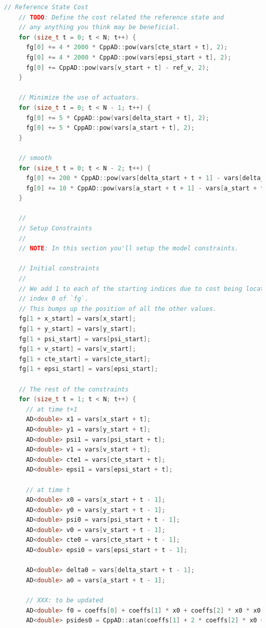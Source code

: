 \documentclass[11pt]{article}
\begin{document}
\begin{lstlisting}[language=C++, caption={MPC solver with ipopt}]
    // Reference State Cost
    // TODO: Define the cost related the reference state and
    // any anything you think may be beneficial.
    for (size_t t = 0; t < N; t++) {
      fg[0] += 4 * 2000 * CppAD::pow(vars[cte_start + t], 2);
      fg[0] += 4 * 2000 * CppAD::pow(vars[epsi_start + t], 2);
      fg[0] += CppAD::pow(vars[v_start + t] - ref_v, 2);
    }

    // Minimize the use of actuators.
    for (size_t t = 0; t < N - 1; t++) {
      fg[0] += 5 * CppAD::pow(vars[delta_start + t], 2);
      fg[0] += 5 * CppAD::pow(vars[a_start + t], 2);
    }

    // smooth
    for (size_t t = 0; t < N - 2; t++) {
      fg[0] += 200 * CppAD::pow(vars[delta_start + t + 1] - vars[delta_start + t], 2);
      fg[0] += 10 * CppAD::pow(vars[a_start + t + 1] - vars[a_start + t], 2);
    }

    //
    // Setup Constraints
    //
    // NOTE: In this section you'll setup the model constraints.

    // Initial constraints
    //
    // We add 1 to each of the starting indices due to cost being located at
    // index 0 of `fg`.
    // This bumps up the position of all the other values.
    fg[1 + x_start] = vars[x_start];
    fg[1 + y_start] = vars[y_start];
    fg[1 + psi_start] = vars[psi_start];
    fg[1 + v_start] = vars[v_start];
    fg[1 + cte_start] = vars[cte_start];
    fg[1 + epsi_start] = vars[epsi_start];

    // The rest of the constraints
    for (size_t t = 1; t < N; t++) {
      // at time t+1
      AD<double> x1 = vars[x_start + t];
      AD<double> y1 = vars[y_start + t];
      AD<double> psi1 = vars[psi_start + t];
      AD<double> v1 = vars[v_start + t];
      AD<double> cte1 = vars[cte_start + t];
      AD<double> epsi1 = vars[epsi_start + t];

      // at time t
      AD<double> x0 = vars[x_start + t - 1];
      AD<double> y0 = vars[y_start + t - 1];
      AD<double> psi0 = vars[psi_start + t - 1];
      AD<double> v0 = vars[v_start + t - 1];
      AD<double> cte0 = vars[cte_start + t - 1];
      AD<double> epsi0 = vars[epsi_start + t - 1];

      AD<double> delta0 = vars[delta_start + t - 1];
      AD<double> a0 = vars[a_start + t - 1];

      // XXX: to be updated
      AD<double> f0 = coeffs[0] + coeffs[1] * x0 + coeffs[2] * x0 * x0 + coeffs[3] * x0 * x0 * x0;
      AD<double> psides0 = CppAD::atan(coeffs[1] + 2 * coeffs[2] * x0 + 3 * coeffs[3] * x0 * x0);


\end{lstlisting}
\end{document}
